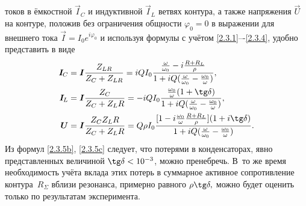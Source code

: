  токов в ёмкостной $\vec{I}_{\! C}$ и индуктивной
$\vec{I}_{\! L}$ ветвях контура, а также напряжения $\vec U$ на контуре, положив без
ограничения общности $\varphi_0=0$ в выражении для внешнего тока $\vec
I=I_0e^{i\varphi_0}$ и используя формулы  с учётом
\eqref{2.3.1}–-\eqref{2.3.4}, удобно представить в виде
\begin{align}
			\eqmark{2.3.5a}
			\vec{I}_{\! C} &= \vec{I}\dfrac{Z_{LR}}{Z_C+Z_{LR}}=
                iQI_0\dfrac{\frac{\omega}{\omega_0}-i \frac{R+R_L}{\rho}}{%
                        1+iQ(\frac{\omega}{\omega_0}-\frac{\omega_0}{\omega})}, \\
			\eqmark{2.3.5b}
			\vec{I}_{\! L}&=\vec{I}\dfrac{Z_C}{Z_C+Z_LR}=
                -iQI_0\dfrac{\frac{\omega_0}{\omega}(1+\tg\delta)}{%
                    1+iQ(\frac{\omega}{\omega_0}-\frac{\omega_0}{\omega})}, \\
			\eqmark{2.3.5c}
			\vec U&=\vec{I}\dfrac{Z_C Z_LR}{Z_C+Z_LR}= 
                Q\rho I_0 \dfrac{[1-i\frac{\omega_0}{\omega}\frac{R+R_L}{\rho}](1+i\tg\delta)}{%
                    1+iQ(\frac{\omega}{\omega_0}-\frac{\omega_0}{\omega})}.
\end{align}
Из формул \eqref{2.3.5b}, \eqref{2.3.5c} следует, что потерями в конденсаторах,
явно представленных величиной $\tg\delta<10^{-3}$, можно пренебречь. 
В~то же время необходимость учёта вклада этих потерь в
суммарное активное сопротивление контура~$R_{\Sigma}$ 
вблизи резонанса, примерно равного $\rho\tg\delta,$ можно будет оценить только по
результатам эксперимента.

